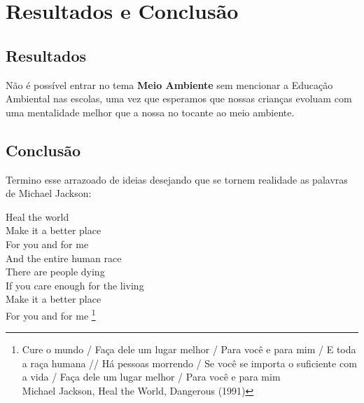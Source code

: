 \chapter{Resultados e Conclusão}

\section{Resultados}

Não é possível entrar no tema \textbf{Meio Ambiente} sem mencionar a Educação Ambiental nas escolas, uma vez que esperamos que nossas crianças evoluam com uma mentalidade melhor que a nossa no tocante ao meio ambiente.



\section{Conclusão}

Termino esse arrazoado de ideias desejando que se tornem realidade as palavras de Michael Jackson:

\begin{citacao}
    Heal the world\\
    Make it a better place\\
    For you and for me\\
    And the entire human race\\

    There are people dying\\
    If you care enough for the living\\
    Make it a better place\\
    For you and for me \footnote{
        Cure o mundo / Faça dele um lugar melhor / Para você e para mim / E toda a raça humana //
        Há pessoas morrendo / Se você se importa o suficiente com a vida / Faça dele um lugar melhor / Para você e para mim \\
        Michael Jackson, Heal the World, Dangerous (1991)
    }
\end{citacao}
